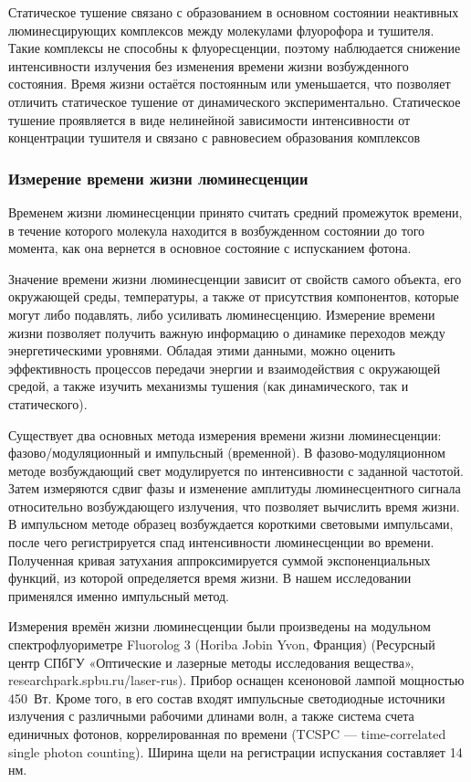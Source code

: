 \documentclass[a4paper, 12pt]{article}
\begin{document}
\begin{onehalfspace}
		Статическое тушение связано с образованием в основном состоянии неактивных люминесцирующих комплексов между молекулами флуорофора и тушителя. Такие комплексы не способны к флуоресценции, поэтому наблюдается снижение интенсивности излучения без изменения времени жизни возбужденного состояния. Время жизни остаётся постоянным или уменьшается, что позволяет отличить статическое тушение от динамического экспериментально. Статическое тушение проявляется в виде нелинейной зависимости интенсивности от концентрации тушителя и связано с равновесием образования комплексов

		\subsubsection*{Измерение времени жизни люминесценции}

		Временем жизни люминесценции принято считать средний промежуток времени, в течение которого молекула находится в возбужденном состоянии до того момента, как она вернется в основное состояние с испусканием фотона.

		Значение времени жизни люминесценции зависит от свойств самого объекта, его окружающей среды, температуры, а также от присутствия компонентов, которые могут либо подавлять, либо усиливать люминесценцию. Измерение времени жизни позволяет получить важную информацию о динамике переходов между энергетическими уровнями. Обладая этими данными, можно оценить эффективность процессов передачи энергии и взаимодействия с окружающей средой, а также изучить механизмы тушения (как динамического, так и статического).

		Существует два основных метода измерения времени жизни люминесценции: фазово\-/модуляционный и импульсный (временной). В фазово-модуляционном методе возбуждающий свет модулируется по интенсивности с заданной частотой. Затем измеряются сдвиг фазы и изменение амплитуды люминесцентного сигнала относительно возбуждающего излучения, что позволяет вычислить время жизни. В импульсном методе образец возбуждается короткими световыми импульсами, после чего регистрируется спад интенсивности люминесценции во времени. Полученная кривая затухания аппроксимируется суммой экспоненциальных функций, из которой определяется время жизни. В нашем исследовании применялся именно импульсный метод.

		Измерения времён жизни люминесценции были произведены на модульном спектрофлуориметре Fluorolog 3 (Horiba Jobin Yvon, Франция) (Ресурсный центр СПбГУ «Оптические и лазерные методы исследования вещества», researchpark.spbu.ru/laser-rus). Прибор оснащен ксеноновой лампой мощностью 450~Вт. Кроме того, в его состав входят импульсные светодиодные источники излучения с различными рабочими длинами волн, а также система счета единичных фотонов, коррелированная по времени (TCSPC — time-correlated single photon counting). Ширина щели на регистрации испускания составляет 14 нм.


\end{onehalfspace}
\end{document}
